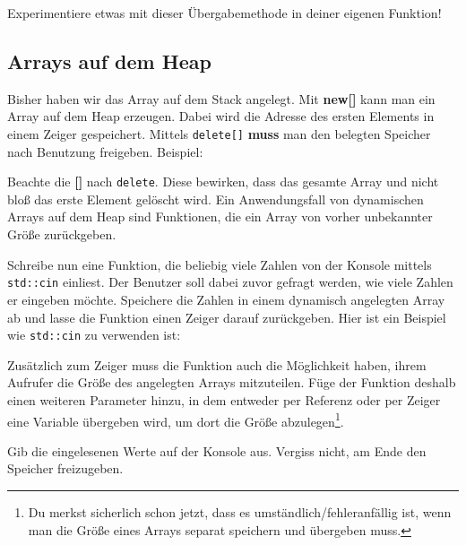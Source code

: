 

Experimentiere etwas mit dieser Übergabemethode in deiner eigenen Funktion!

\subsection{Arrays auf dem Heap}
Bisher haben wir das Array auf dem Stack angelegt.
Mit \textbf{new[]} kann man ein Array auf dem Heap erzeugen.
Dabei wird die Adresse des ersten Elements in einem Zeiger gespeichert.
Mittels \lstinline{delete[]} \textbf{muss} man den belegten Speicher nach Benutzung freigeben.
Beispiel:



Beachte die \textbf{[]} nach \lstinline{delete}.
Diese bewirken, dass das gesamte Array und nicht bloß das erste Element gelöscht wird.
Ein Anwendungsfall von dynamischen Arrays auf dem Heap sind Funktionen, die ein Array von vorher unbekannter Größe zurückgeben.

Schreibe nun eine Funktion, die beliebig viele Zahlen von der Konsole mittels \lstinline{std::cin} einliest.
Der Benutzer soll dabei zuvor gefragt werden, wie viele Zahlen er eingeben möchte.
Speichere die Zahlen in einem dynamisch angelegten Array ab und lasse die Funktion einen Zeiger darauf zurückgeben.
Hier ist ein Beispiel wie \lstinline{std::cin} zu verwenden ist:



Zusätzlich zum Zeiger muss die Funktion auch die Möglichkeit haben, ihrem Aufrufer die Größe des angelegten Arrays mitzuteilen.
Füge der Funktion deshalb einen weiteren Parameter hinzu, in dem entweder per Referenz oder per Zeiger eine Variable übergeben wird, um dort die Größe abzulegen\footnote{Du merkst sicherlich schon jetzt, dass es umständlich/fehleranfällig ist, wenn man die Größe eines Arrays separat speichern und übergeben muss.}.

Gib die eingelesenen Werte auf der Konsole aus.
Vergiss nicht, am Ende den Speicher freizugeben.
